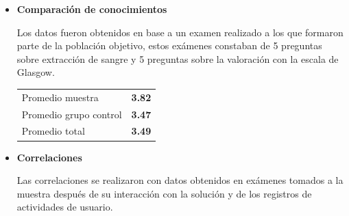 \documentclass[portrait,final,a0paper,fontscale=0.277]{baposter}
\begin{document}
\begin{poster}
{\begin{multicols}{2}
\begin{itemize}
\begin{center}
 \end{center}
 
 \item \textbf{Comparación de conocimientos}
	
	Los datos fueron obtenidos en base a un examen realizado a los 
	que formaron parte de la población objetivo, estos exámenes 
	constaban de 5 preguntas sobre extracción de sangre y 5 preguntas 
	sobre la valoración con la escala de Glasgow.	
	
	\begin{center}
		\scriptsize 
		\begin{tabular}{lr}
			\toprule
			Promedio muestra & \textbf{3.82} \\
			Promedio grupo control  & \textbf{3.47} \\
			\midrule
			Promedio total    & \textbf{3.49} \\
			\bottomrule
		\end{tabular}
	\end{center}
 
 
 \item \textbf{Correlaciones}
 
 	Las correlaciones se realizaron con datos obtenidos en exámenes tomados a la muestra después de su interacción con la solución y de los registros de actividades de usuario.
	
	\begin{center}


\end{center}
\end{itemize}
\end{multicols}}
\end{poster}
\end{document}
